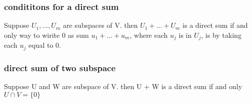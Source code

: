 \documentclass[a4paper,12pt]{article}
\begin{document}
        \subsubsection{\textbf{\color{cyan} condititons for a direct sum}}
        Suppose $U_1,...,U_m$ are subspaces of V. then $U_1 + ... + U_m$ is a direct sum if and only way to wirite 0 as sum $u_1 + ... +u_m$,
        where each $u_j$ is in $U_j$, is by taking each $u_j$ equal to 0.
        \subsubsection{\textbf{\color{cyan} direct sum of two subspace}}
        Suppose U and W are subspace of V. then U + W is a direct sum if and only $U \cap V = \{0\}$
\end{document}
